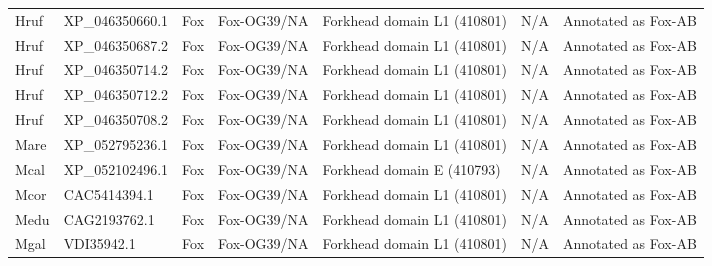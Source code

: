 \documentclass[../main.tex]{subfiles}
\begin{document}
\begin{landscape}
\begin{longtable}{lllllll}
		Hruf           & XP\_046350660.1       & Fox            & Fox-OG39/NA         & Forkhead domain L1 (410801)                 & N/A                                                                    & Annotated as Fox-AB  \\
		Hruf           & XP\_046350687.2       & Fox            & Fox-OG39/NA         & Forkhead domain L1 (410801)                 & N/A                                                                    & Annotated as Fox-AB  \\
		Hruf           & XP\_046350714.2       & Fox            & Fox-OG39/NA         & Forkhead domain L1 (410801)                 & N/A                                                                    & Annotated as Fox-AB  \\
		Hruf           & XP\_046350712.2       & Fox            & Fox-OG39/NA         & Forkhead domain L1 (410801)                 & N/A                                                                    & Annotated as Fox-AB  \\
		Hruf           & XP\_046350708.2       & Fox            & Fox-OG39/NA         & Forkhead domain L1 (410801)                 & N/A                                                                    & Annotated as Fox-AB  \\
		Mare           & XP\_052795236.1       & Fox            & Fox-OG39/NA         & Forkhead domain L1 (410801)                 & N/A                                                                    & Annotated as Fox-AB  \\
		Mcal           & XP\_052102496.1       & Fox            & Fox-OG39/NA         & Forkhead domain E (410793)                  & N/A                                                                    & Annotated as Fox-AB  \\
		Mcor           & CAC5414394.1          & Fox            & Fox-OG39/NA         & Forkhead domain L1 (410801)                 & N/A                                                                    & Annotated as Fox-AB  \\
		Medu           & CAG2193762.1          & Fox            & Fox-OG39/NA         & Forkhead domain L1 (410801)                 & N/A                                                                    & Annotated as Fox-AB  \\
		Mgal           & VDI35942.1            & Fox            & Fox-OG39/NA         & Forkhead domain L1 (410801)                 & N/A                                                                    & Annotated as Fox-AB  \\

\end{longtable}
\end{landscape}
\end{document}
